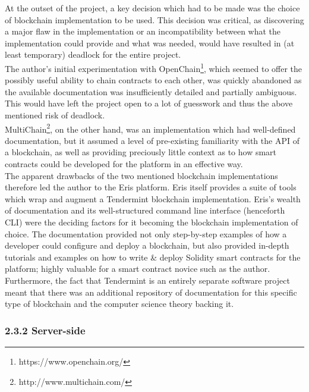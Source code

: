 \documentclass[12pt]{report}
\begin{document}
At the outset of the project, a key decision which had to be made was
the choice of blockchain implementation to be used. This decision was
critical, as discovering a major flaw in the implementation or an
incompatibility between what the implementation could provide and what
was needed, would have resulted in (at least temporary) deadlock for the
entire project.\\
The author's initial experimentation with
OpenChain\footnote{https://www.openchain.org/}, which seemed to
offer the possibly useful ability to chain contracts to each other, was
quickly abandoned as the available documentation was insufficiently
detailed and partially ambiguous. This would have left the project open
to a lot of guesswork and thus the above mentioned risk of deadlock.\\
MultiChain\footnote{http://www.multichain.com/}, on the other
hand, was an implementation which had well-defined documentation, but it
assumed a level of pre-existing familiarity with the API of a
blockchain, as well as providing preciously little context as to how
smart contracts could be developed for the platform in an effective
way.\\
The apparent drawbacks of the two mentioned blockchain implementations
therefore led the author to the
Eris\cite{1erisindustries} platform. Eris itself
provides a suite of tools which wrap and augment a
Tendermint\cite{1tendermint} blockchain
implementation. Eris's wealth of documentation and its well-structured
command line interface (henceforth CLI) were the deciding factors for it
becoming the blockchain implementation of choice. The documentation
provided not only step-by-step examples of how a developer could
configure and deploy a blockchain, but also provided in-depth tutorials
and examples on how to write \& deploy
Solidity\cite{1solidity}
smart contracts for the platform; highly valuable for a smart contract
novice such as the author. Furthermore, the fact that Tendermint is an
entirely separate software project meant that there was an additional
repository of documentation for this specific type of blockchain and the
computer science theory backing it.

\subsubsection{2.3.2 Server-side}\label{server-side}
\end{document}
